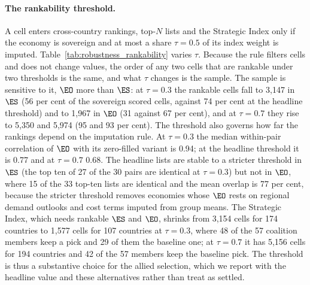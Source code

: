 \paragraph{The rankability threshold.} A cell enters cross-country rankings, top-$N$ lists and
the Strategic Index only if the economy is sovereign and at most a share $\tau=0.5$ of its index
weight is imputed. Table~\ref{tab:robustness_rankability} varies $\tau$. Because the rule
filters cells and does not change values, the order of any two cells that are rankable under
two thresholds is the same, and what $\tau$ changes is the sample. The sample is sensitive to
it, $\EO$ more than $\ES$: at $\tau=0.3$ the rankable cells fall to 3{,}147 in $\ES$ (56 per
cent of the sovereign scored cells, against 74 per cent at the headline threshold) and to
1{,}967 in $\EO$ (31 against 67 per cent), and at $\tau=0.7$ they rise to 5{,}350 and 5{,}974
(95 and 93 per cent). The threshold also governs how far the rankings depend on the imputation
rule. At $\tau=0.3$ the median within-pair correlation of $\EO$ with its zero-filled variant is
0.94; at the headline threshold it is 0.77 and at $\tau=0.7$ 0.68. The headline lists are
stable to a stricter threshold in $\ES$ (the top ten of 27 of the 30 pairs are identical at
$\tau=0.3$) but not in $\EO$, where 15 of the 33 top-ten lists are identical and the mean
overlap is 77 per cent, because the stricter threshold removes economies whose $\EO$ rests on
regional demand outlooks and cost terms imputed from group means. The Strategic Index, which
needs rankable $\ES$ and $\EO$, shrinks from 3{,}154 cells for 174 countries to 1{,}577 cells for
107 countries at $\tau=0.3$, where 48 of the 57 coalition members keep a pick and 29 of them the
baseline one; at $\tau=0.7$ it has 5{,}156 cells for 194 countries and 42 of the 57 members
keep the baseline pick. The threshold is thus a substantive choice for the allied selection, which
we report with the headline value and these alternatives rather than treat as settled.




